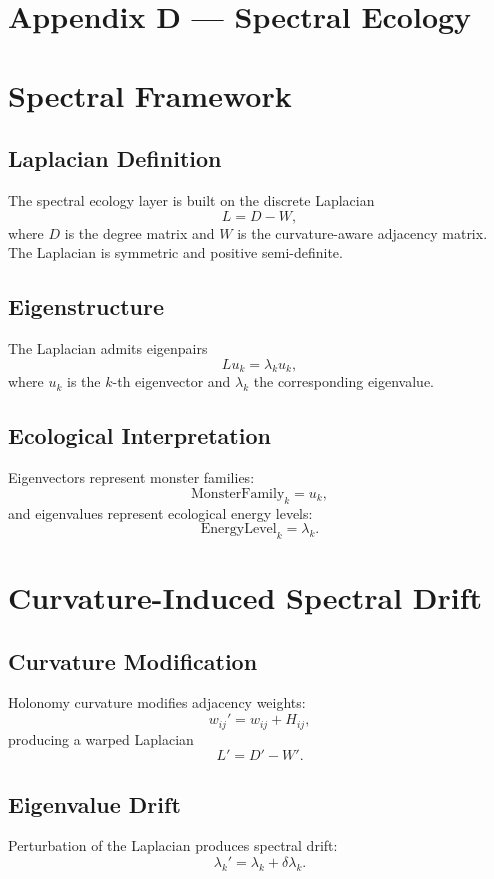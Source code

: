 \appendix
\section*{Appendix D — Spectral Ecology}

\section{Spectral Framework}

\subsection{Laplacian Definition}
The spectral ecology layer is built on the discrete Laplacian
\[
L = D - W,
\]
where $D$ is the degree matrix and $W$ is the curvature-aware adjacency
matrix. The Laplacian is symmetric and positive semi-definite.

\subsection{Eigenstructure}
The Laplacian admits eigenpairs
\[
L u_k = \lambda_k u_k,
\]
where $u_k$ is the $k$-th eigenvector and $\lambda_k$ the corresponding
eigenvalue.

\subsection{Ecological Interpretation}
Eigenvectors represent monster families:
\[
\text{MonsterFamily}_k = u_k,
\]
and eigenvalues represent ecological energy levels:
\[
\text{EnergyLevel}_k = \lambda_k.
\]

\section{Curvature-Induced Spectral Drift}

\subsection{Curvature Modification}
Holonomy curvature modifies adjacency weights:
\[
w_{ij}' = w_{ij} + H_{ij},
\]
producing a warped Laplacian
\[
L' = D' - W'.
\]

\subsection{Eigenvalue Drift}
Perturbation of the Laplacian produces spectral drift:
\[
\lambda_k' = \lambda_k + \delta \lambda_k.
\]

